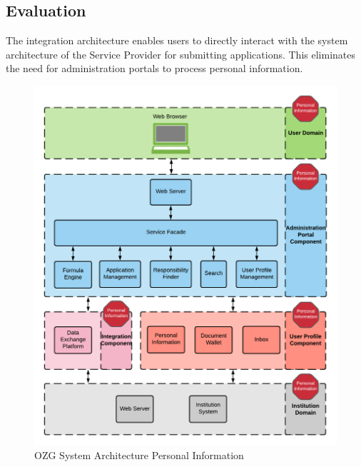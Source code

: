 \subsection{Evaluation}
The integration architecture enables users to directly interact with the system architecture of the Service Provider for submitting applications. This eliminates the need for administration portals to process personal information.

\begin{figure}[h]
    \centering
    \includegraphics[scale=0.6]{Diagrams/Integration Architecture 2/OZG Personal Information.pdf}
    \caption{OZG System Architecture Personal Information}
    \label{integration2:ozg_personal_information}
\end{figure}

